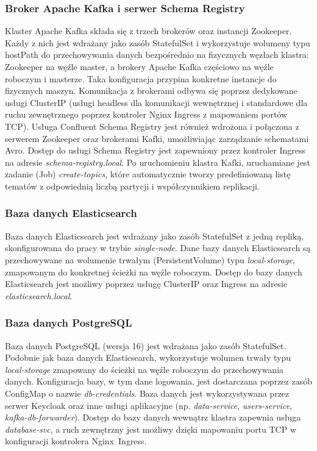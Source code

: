 \subsubsection{Broker Apache Kafka i serwer Schema Registry}
Klaster Apache Kafka składa się z trzech brokerów oraz instancji Zookeeper. Każdy z nich jest wdrażany jako zasób StatefulSet i wykorzystuje wolumeny typu hostPath do przechowywania danych bezpośrednio na fizycznych węzłach klastra: Zookeeper na węźle master, a brokery Apache Kafka częściowo na węźle roboczym i masterze. Taka konfiguracja przypina konkretne instancje do fizycznych maszyn. Komunikacja z brokerami odbywa się poprzez dedykowane usługi \mbox{ClusterIP} (usługi headless dla komunikacji wewnętrznej i standardowe dla ruchu zewnętrznego poprzez kontroler Nginx Ingress z mapowaniem portów TCP).
\newpage
Usługa Confluent Schema Registry \cite{confluent_schema_registry} jest również wdrożona i połączona z serwerem Zookeeper oraz brokerami Kafki, umożliwiając zarządzanie schematami Avro. Dostęp do usługi Schema Registry jest zapewniony przez kontroler Ingress na adresie \textit{schema-registry.local}. Po uruchomieniu klastra Kafki, uruchamiane jest zadanie (Job) \textit{create-topics}, które automatycznie tworzy predefiniowaną listę tematów z odpowiednią liczbą partycji i współczynnikiem replikacji.

\subsubsection{Baza danych Elasticsearch}
Baza danych Elasticsearch jest wdrażany jako zasób StatefulSet z jedną repliką, skonfigurowana do pracy w trybie \textit{single-node}. Dane bazy danych Elasticsearch są przechowywane na wolumenie trwałym (PersistentVolume) typu \textit{local-storage}, zmapowanym do konkretnej ścieżki na węźle roboczym. Dostęp do bazy danych Elasticsearch jest możliwy poprzez usługę ClusterIP oraz Ingress na adresie \textit{elasticsearch.local}.

\subsubsection{Baza danych PostgreSQL}
Baza danych PostgreSQL (wersja 16) jest wdrażana jako zasób StatefulSet. Podobnie jak baza danych Elasticsearch, wykorzystuje wolumen trwały typu \textit{local-storage} zmapowany do ścieżki na węźle roboczym do przechowywania danych. Konfiguracja bazy, w tym dane logowania, jest dostarczana poprzez zasób \mbox{ConfigMap} o nazwie \textit{db-credentials}. Baza danych jest wykorzystywana przez serwer Keycloak oraz inne usługi aplikacyjne (np. \textit{data-service}, \textit{users-service}, \textit{kafka-db-forwarder}). Dostęp do bazy danych wewnątrz klastra zapewnia usługa \textit{database-svc}, a ruch zewnętrzny jest możliwy dzięki mapowaniu portu TCP w konfiguracji kontrolera \mbox{Nginx Ingress}.

